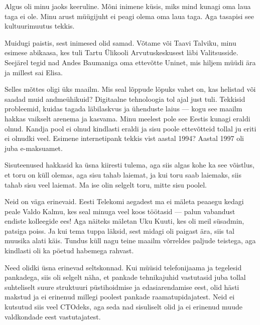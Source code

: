 Algus oli minu jaoks keeruline. Mõni inimene küsis, miks mind kunagi 
oma laua taga ei ole. Minu arust müügijuht ei peagi olema oma laua taga. Aga tasapisi see kultuurimuutus tekkis.


Muidugi paistis, sest inimesed olid samad. Võtame või Taavi 
Talviku, minu esimese abikaasa, kes tuli Tartu 
Ülikooli Arvutuskeskusest läbi 
Valitsusside. Seejärel tegid nad Andes 
Baumaniga oma ettevõtte Uninet, mis hiljem müüdi ära ja millest sai 
Elisa. 

Selles mõttes oligi üks maailm. Mis seal lõppude lõpuks vahet on, kas helistad või saadad muid 
andmeühikuid? Digitaalne tehnoloogia tol ajal just tuli. Tekkisid 
probleemid, kuidas tagada läbilaskvus ja ühenduste laius --- kogu see maailm 
hakkas vaikselt arenema ja kasvama. Minu meelest 
pole see Eestis kunagi eraldi olnud. Kandja pool ei olnud kindlasti eraldi ja sisu 
poole ettevõtteid tollal ju eriti ei olnudki veel. Esimene internetipank tekkis vist aastal 1994? Aastal 1997 oli juba e-maksuamet.

Sisuteenused hakkasid ka üsna kiiresti tulema, aga siis algas kohe ka see 
võistlus, et toru on küll olemas, aga sisu tahab laiemat, ja kui toru saab laiemaks, siis tahab sisu 
veel laiemat. Ma ise olin selgelt toru, mitte sisu poolel.


Neid on väga erinevaid. Eesti Telekomi aegadest ma ei mäleta peaaegu kedagi 
peale Valdo Kalmu, kes seal minuga veel koos töötasid --- palun vabandust endiste kolleegide ees! Aga näiteks mäletan Uku 
Kuuti, kes oli meil süsadmin, patsiga poiss. Ja 
kui tema tuppa läksid, sest midagi oli paigast ära, siis tal muusika alati käis. 
Tundus küll nagu teine maailm võrreldes paljude teistega, aga kindlasti 
oli ka pöetud habemega rahvast.

Need olidki üsna erinevad seltskonnad. Kui müüsid telefonijaama ja tegelesid 
pankadega, siis oli selgelt näha, et pankade tehnikajuhid vastutasid juba 
tollal suhteliselt suure struktuuri püstihoidmise ja edasiarendamise 
eest, olid hästi makstud ja ei erinenud millegi poolest pankade
raamatupidajatest. Neid ei kutsutud siis veel CTOdeks, aga seda nad sisuliselt 
olid ja ei erinenud muude valdkondade eest vastutajatest. 

